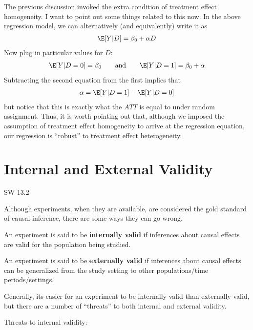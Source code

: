 \documentclass[
  letterpaper,
  DIV=11,
  numbers=noendperiod]{scrreprt}
\begin{document}
The previous discussion invoked the extra condition of treatment effect
homogeneity. I want to point out some things related to this now. In the
above regression model, we can alternatively (and equivalently) write it
as \begin{align*}
  \E[Y|D] = \beta_0 + \alpha D
\end{align*} Now plug in particular values for \(D\): \begin{align*}
  \E[Y|D=0] = \beta_0 \qquad \textrm{and} \qquad \E[Y|D=1] = \beta_0 + \alpha
\end{align*} Subtracting the second equation from the first implies that
\begin{align*}
  \alpha = \E[Y|D=1] - \E[Y|D=0]
\end{align*} but notice that this is exactly what the \(ATT\) is equal
to under random assignment. Thus, it is worth pointing out that,
although we imposed the assumption of treatment effect homogeneity to
arrive at the regression equation, our regression is ``robust'' to
treatment effect heterogeneity.

\section{Internal and External
Validity}\label{internal-and-external-validity}

SW 13.2

Although experiments, when they are available, are considered the gold
standard of causal inference, there are some ways they can go wrong.

An experiment is said to be \textbf{internally valid} if inferences
about causal effects are valid for the population being studied.

An experiment is said to be \textbf{externally valid} if inferences
about causal effects can be generalized from the study setting to other
populations/time periods/settings.

Generally, its easier for an experiment to be internally valid than
externally valid, but there are a number of ``threats'' to both internal
and external validity.

Threats to internal validity:
\end{document}
